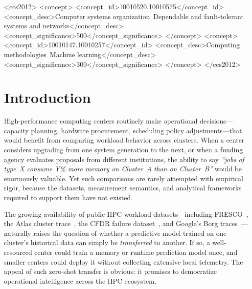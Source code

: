 \documentclass[sigconf]{acmart}
\begin{document}
\begin{CCSXML}
<ccs2012>
   <concept>
       <concept_id>10010520.10010575</concept_id>
       <concept_desc>Computer systems organization~Dependable and fault-tolerant systems and networks</concept_desc>
       <concept_significance>500</concept_significance>
   </concept>
   <concept>
       <concept_id>10010147.10010257</concept_id>
       <concept_desc>Computing methodologies~Machine learning</concept_desc>
       <concept_significance>300</concept_significance>
   </concept>
</ccs2012>
\end{CCSXML}



\maketitle

\section{Introduction}

High-performance computing centers routinely make operational decisions---capacity planning, hardware procurement, scheduling policy adjustments---that would benefit from comparing workload behavior across clusters.
When a center considers upgrading from one system generation to the next, or when a funding agency evaluates proposals from different institutions, the ability to say \emph{``jobs of type~X consume Y\% more memory on Cluster~A than on Cluster~B''} would be enormously valuable.
Yet such comparisons are rarely attempted with empirical rigor, because the datasets, measurement semantics, and analytical frameworks required to support them have not existed.

The growing availability of public HPC workload datasets---including FRESCO~\cite{mckerracher2025fresco}, the Atlas cluster trace~\cite{atlas2020}, the CFDR failure dataset~\cite{cfdr2010}, and Google's Borg traces~\cite{google_borg_2015}---naturally raises the question of whether a predictive model trained on one cluster's historical data can simply be \emph{transferred} to another.
If so, a well-resourced center could train a memory or runtime prediction model once, and smaller centers could deploy it without collecting extensive local telemetry.
The appeal of such zero-shot transfer is obvious: it promises to democratize operational intelligence across the HPC ecosystem.
\end{document}
